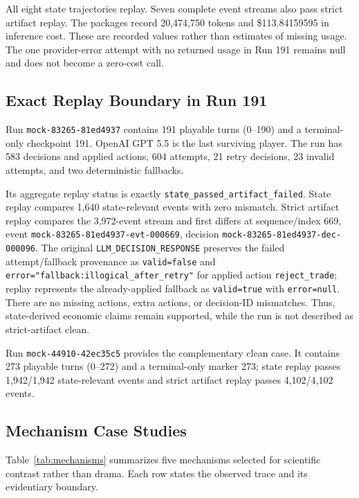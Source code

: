 \documentclass[conference]{IEEEtran}
\newcommand{\code}[1]{\texttt{#1}}
\begin{document}
All eight state trajectories replay. Seven complete event streams also pass strict artifact replay. The packages record 20,474,750 tokens and \$113.84159595 in inference cost. These are recorded values rather than estimates of missing usage. The one provider-error attempt with no returned usage in Run 191 remains null and does not become a zero-cost call.

\subsection{Exact Replay Boundary in Run 191}

Run \code{mock-83265-81ed4937} contains 191 playable turns (0--190) and a terminal-only checkpoint 191. OpenAI GPT 5.5 is the last surviving player. The run has 583 decisions and applied actions, 604 attempts, 21 retry decisions, 23 invalid attempts, and two deterministic fallbacks.

Its aggregate replay status is exactly \code{state\_passed\_artifact\_failed}. State replay compares 1,640 state-relevant events with zero mismatch. Strict artifact replay compares the 3,972-event stream and first differs at sequence/index 669, event \code{mock-83265-81ed4937-evt-000669}, decision \code{mock-83265-81ed4937-dec-000096}. The original \code{LLM\_DECISION\_RESPONSE} preserves the failed attempt/fallback provenance as \code{valid=false} and \code{error="fallback:illogical\_after\_retry"} for applied action \code{reject\_trade}; replay represents the already-applied fallback as \code{valid=true} with \code{error=null}. There are no missing actions, extra actions, or decision-ID mismatches. Thus, state-derived economic claims remain supported, while the run is not described as strict-artifact clean.

Run \code{mock-44910-42ec35c5} provides the complementary clean case. It contains 273 playable turns (0--272) and a terminal-only marker 273; state replay passes 1,942/1,942 state-relevant events and strict artifact replay passes 4,102/4,102 events.

\subsection{Mechanism Case Studies}

Table~\ref{tab:mechanisms} summarizes five mechanisms selected for scientific contrast rather than drama. Each row states the observed trace and its evidentiary boundary.
\end{document}
